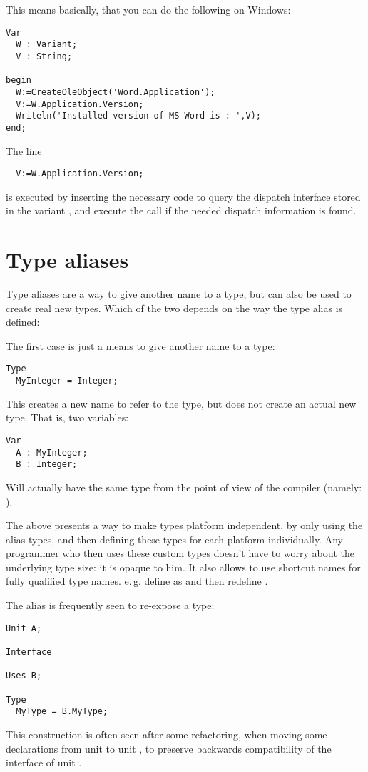 This means basically, that you can do the following on Windows:
\begin{verbatim}
Var
  W : Variant;
  V : String;

begin
  W:=CreateOleObject('Word.Application');
  V:=W.Application.Version;
  Writeln('Installed version of MS Word is : ',V);
end;
\end{verbatim}
The line
\begin{verbatim}
  V:=W.Application.Version;
\end{verbatim}
is executed by inserting the necessary code to query the dispatch interface
stored in the variant , and execute the call if the needed dispatch
information is found.

\section{Type aliases}
Type aliases are a way to give another name to a type, but can also be used
to create real new types. Which of the two depends on the way the type alias
is defined:

The first case is just a means to give another name to a type:
\begin{verbatim}
Type
  MyInteger = Integer;
\end{verbatim}
This creates a new name to refer to the  type, but does not create an
actual new type. That is, two variables:
\begin{verbatim}
Var
  A : MyInteger;
  B : Integer;
\end{verbatim}
Will actually have the same type from the point of view of the compiler
(namely: ).

The above presents a way to make types platform independent, by only using the
alias types, and then defining these types for each platform individually.
Any programmer who then uses these custom types doesn't have to worry
about the underlying type size: it is opaque to him. It also allows to use shortcut names
for fully qualified type names. e.\,g. define  as
 and then redefine .

The alias is frequently seen to re-expose a type:
\begin{verbatim}
Unit A;

Interface

Uses B;

Type
  MyType = B.MyType;
\end{verbatim}
This construction is often seen after some refactoring, when moving some
declarations from unit  to unit , to preserve backwards compatibility
of the interface of unit .

